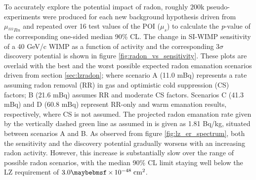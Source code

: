{To accurately explore the potential impact of radon, roughly $200$k pseudo-experiments were produced for each new background hypothesis driven from $\mu_{^{222}Rn}$ and repeated over 16 test values of the POI ($\mu_{s}$) to calculate the \textit{p}-value of the corresponding one-sided median 90\% CL. The change in SI-WIMP sensitivity of a 40 GeV/c\squared{} WIMP as a function of \RnTTT{} activity and the corresponding $3\sigma$ discovery potential is shown in figure \ref{fig:radon_vs_sensitivity}. These plots are overlaid with the best and the worst possible expected radon emanation scenarios driven from section \ref{sec:lzradon}; where scenario A (11.0 mBq) represents a rate assuming radon removal (RR) in gas and optimistic cold suppression (CS) factors; B (21.6 mBq) assumes RR and moderate CS factors. Scenarios C (41.3 mBq) and D (60.8 mBq) represent RR-only and warm emanation results, respectively, where CS is not assumed. The projected radon emanation rate given by the vertically dashed green line as assumed in \cite{akerib2018projected} is given as 1.81 \micro{}Bq/kg, situated between scenarios A and B. As observed from figure \ref{fig:lz_er_spectrum}, both the sensitivity and the discovery potential gradually worsens with an increasing radon activity. However, this increase is substantially slow over the range of possible radon scenarios, with the median 90\% CL limit staying well below the LZ requirement of $3.0 \times 10^{-48} \; \MathText{cm}^2$. 

}
